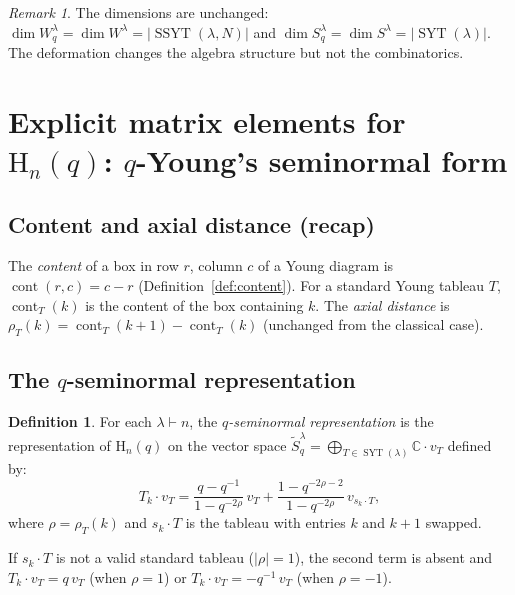 \documentclass[12pt,a4paper]{article}
\theoremstyle{definition}
\newtheorem{definition}[theorem]{Definition}
\theoremstyle{remark}
\newtheorem{remark}[theorem]{Remark}
\newcommand{\C}{\mathbb{C}}
\newcommand{\SYT}{\operatorname{SYT}}
\newcommand{\SSYT}{\operatorname{SSYT}}
\newcommand{\cont}{\operatorname{cont}}
\begin{document}
\begin{remark}
The dimensions are unchanged:
$\dim W_q^\lambda = \dim W^\lambda = |\SSYT(\lambda, N)|$ and
$\dim S_q^\lambda = \dim S^\lambda = |\SYT(\lambda)|$. The deformation
changes the algebra structure but not the combinatorics.
\end{remark}

\section{Explicit matrix elements for $\mathrm{H}_n(q)$:
  $q$-Young's seminormal form}
\label{sec:q-Young}

\subsection{Content and axial distance (recap)}

The \emph{content} of a box in row $r$, column $c$ of a Young diagram
is $\cont(r,c) = c - r$ (Definition~\ref{def:content}). For a standard
Young tableau $T$, $\cont_T(k)$ is the content of the box containing
$k$. The \emph{axial distance} is $\rho_T(k) = \cont_T(k{+}1) -
\cont_T(k)$ (unchanged from the classical case).

\subsection{The $q$-seminormal representation}

\begin{definition}\label{def:q-Young}
For each $\lambda \vdash n$, the \emph{$q$-seminormal representation}
is the representation of $\mathrm{H}_n(q)$ on the vector space
$\widetilde{S}_q^\lambda = \bigoplus_{T \in \SYT(\lambda)} \C \cdot v_T$
defined by:
\begin{equation}\label{eq:q-Young}
  T_k \cdot v_T = \frac{q - q^{-1}}{1 - q^{-2\rho}}\, v_T
  + \frac{1 - q^{-2\rho - 2}}{1 - q^{-2\rho}}\, v_{s_k \cdot T},
\end{equation}
where $\rho = \rho_T(k)$ and $s_k \cdot T$ is the tableau with
entries $k$ and $k{+}1$ swapped.

If $s_k \cdot T$ is not a valid standard tableau ($|\rho| = 1$), the
second term is absent and
$T_k \cdot v_T = q\, v_T$ (when $\rho = 1$) or
$T_k \cdot v_T = -q^{-1}\, v_T$ (when $\rho = -1$).
\end{definition}
\end{document}
